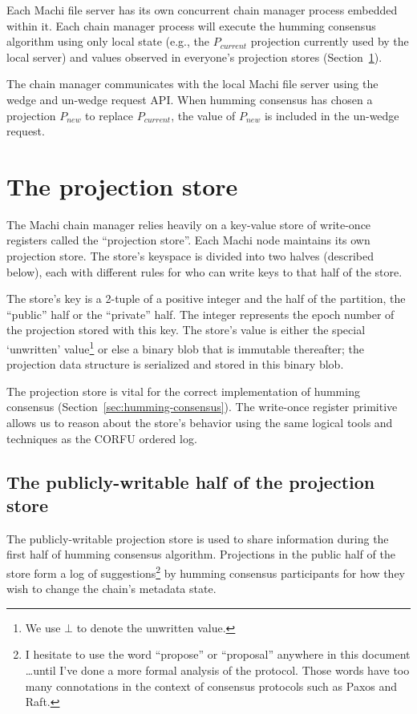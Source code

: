 \documentclass[preprint,10pt]{sigplanconf}
\begin{document}
Each Machi file server has its own concurrent chain manager
process embedded within it.  Each chain manager process will
execute the humming consensus algorithm using only local state (e.g.,
the $P_{current}$ projection currently used by the local server) and
values observed in everyone's projection stores
(Section~\ref{sec:projection-store}).

The chain manager communicates with the local Machi
file server using the wedge and un-wedge request API.  When humming
consensus has chosen a projection $P_{new}$ to replace $P_{current}$,
the value of $P_{new}$ is included in the un-wedge request.

\section{The projection store}
\label{sec:projection-store}

The Machi chain manager relies heavily on a key-value store of
write-once registers called the ``projection store''.
Each Machi node maintains its own projection store.
The store's keyspace is divided into two halves (described below),
each with different rules for who can write keys to that half of the
store.

The store's key is a 2-tuple of a positive integer and the half of
the partition, the ``public'' half or the ``private'' half.
The integer represents the epoch number of the projection stored with
this key.  The
store's value is either the special `unwritten' value\footnote{We use
  $\bot$ to denote the unwritten value.} or else a binary blob that is
immutable thereafter; the projection data structure is
serialized and stored in this binary blob.

The projection store is vital for the correct implementation of humming
consensus (Section~\ref{sec:humming-consensus}).  The write-once
register primitive allows us to reason about the store's behavior
using the same logical tools and techniques as the CORFU ordered log.

\subsection{The publicly-writable half of the projection store}

The publicly-writable projection store is used to share information
during the first half of humming consensus algorithm.  Projections
in the public half of the store form a log of
suggestions\footnote{I hesitate to use the word ``propose'' or ``proposal''
  anywhere in this document \ldots until I've done a more formal
  analysis of the protocol.  Those words have too many connotations in
  the context of consensus protocols such as Paxos and Raft.}
by humming consensus participants for how they wish to change the
chain's metadata state.
\end{document}
